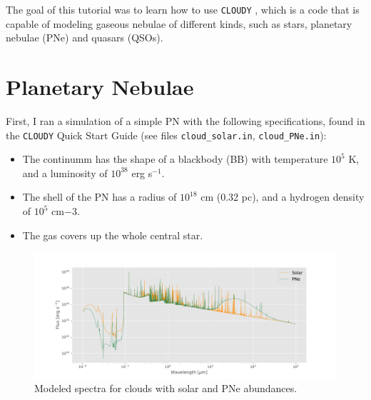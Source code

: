 \documentclass[letterpaper, oneside]{article}
\begin{document}
	
\templatePagecfg


The goal of this tutorial was to learn how to use \texttt{CLOUDY} \cite{cloudy_gitlab, Ferland_1998, Ferland_2003}, which is a code that is capable of modeling gaseous nebulae of different kinds, such as stars, planetary nebulae (PNe) and quasars (QSOs).

\section{Planetary Nebulae}

First, I ran a simulation of a simple PN with the following specifications, found in the \texttt{CLOUDY} Quick Start Guide (see files \texttt{cloud\_solar.in}, \texttt{cloud\_PNe.in}):
\begin{itemize}
	\item The continumm has the shape of a blackbody (BB) with temperature $10^5$ K, and a luminosity of $10^{38}$ erg s$^{-1}$.
	
	\item The shell of the PN has a radius of $10^{18}$ cm (0.32 pc), and a hydrogen density of $10^5$ cm${-3}$.
	
	\item The gas covers up the whole central star.
	
\end{itemize}

\begin{figure}[h]
	\centering
	\includegraphics[width=1.1\textwidth]{../spec_clouds_solar_PNe_full_range.pdf}
	\caption{ Modeled spectra for clouds with solar and PNe abundances.}
	\label{fig:spectra_solar_PNe_full}
\end{figure}
\end{document}
